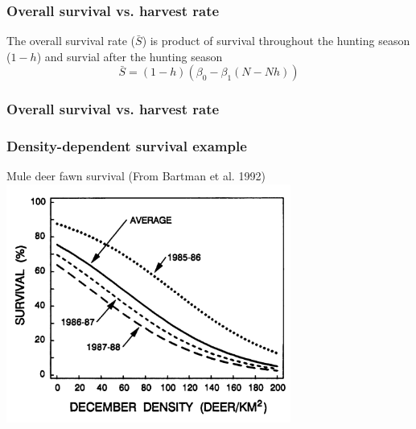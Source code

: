 \documentclass[color=usenames,dvipsnames]{beamer}\usepackage[]{graphicx}\usepackage[]{xcolor}
\begin{document}
\begin{frame}
  \frametitle{Overall survival vs. harvest rate}
  The overall survival rate ($\bar{S}$) is product of survival
  throughout the hunting season ($1-h$) and survial after the hunting
  season
  \Large
  \[
    \bar{S} = (1-h)(\beta_0 - \beta_1 (N - Nh))
  \]
\end{frame}


\begin{frame}[fragile]
  \frametitle{Overall survival vs. harvest rate}
  \vspace{-0.5cm}


\begin{center}
\end{center}
\end{frame}





\begin{frame}
  \frametitle{Density-dependent survival example}
  Mule deer fawn survival (From Bartman et al. 1992) \\
  \centering
  \vfill
  \includegraphics[width=0.7\textwidth]{figs/deer-survival-dd} \\
\end{frame}
\end{document}
